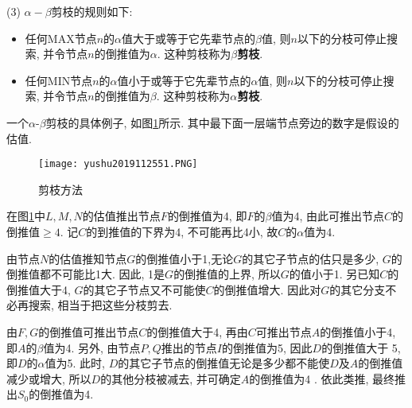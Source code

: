 (3) $\alpha-\beta$剪枝的规则如下:
    \begin{itemize}
    \item 任何MAX节点$n$的$\alpha$值大于或等于它先辈节点的$\beta$值, 则$n$以下的分枝可停止搜索, 并令节点$n$的倒推值为$\alpha$. 这种剪枝称为\textbf{$\beta$剪枝}.
    \item 任何MIN节点$n$的$\alpha$值小于或等于它先辈节点的$\alpha$值, 则$n$以下的分枝可停止搜索, 并令节点$n$的倒推值为$\beta$. 这种剪枝称为\textbf{$\alpha$剪枝}.
    \end{itemize}
\begin{example}
    一个$\alpha$-$\beta$剪枝的具体例子, 如图\ref{AI32fig51}所示. 其中最下面一层端节点旁边的数字是假设的估值.
\end{example}
\begin{figure}[H]
    \centering
    \texttt{[image: yushu2019112551.PNG]}
    \caption{剪枝方法}
    \label{AI32fig51}
\end{figure}
在图\ref{AI32fig51}中$L,M,N$的估值推出节点$F$的倒推值为4, 即$F$的$\beta$值为4, 由此可推出节点$C$的倒推值$\geq 4$.
记$C$的到推值的下界为4, 不可能再比4小, 故$C$的$\alpha$值为4.

由节点$N$的估值推知节点$G$的倒推值小于1,无论$G$的其它子节点的估只是多少, $G$的倒推值都不可能比1大.
因此, 1是$G$的倒推值的上界, 所以$G$的值小于1.
另已知$C$的倒推值大于4, $G$的其它子节点又不可能使$C$的倒推值增大. 因此对$G$的其它分支不必再搜索, 相当于把这些分枝剪去.

由$F,G$的倒推值可推出节点$C$的倒推值大于4, 再由$C$可推出节点$A$的倒推值小于4, 即$A$的$\beta$值为4.
另外, 由节点$P,Q$推出的节点$I$的倒推值为5, 因此$D$的倒推值大于 5, 即$D$的$\alpha$值为5.
此时, $D$的其它子节点的倒推值无论是多少都不能使$D$及$A$的倒推值减少或增大, 所以$D$的其他分枝被减去, 并可确定$A$的倒推值为4 .
依此类推, 最终推出$S_0$的倒推值为4.
